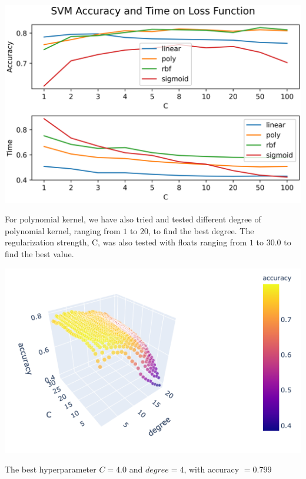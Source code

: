 \documentclass[11.5pt]{article}
\begin{document}
\begin{enumerate}
\begin{itemize}
\begin{enumerate}
                \includegraphics[width=0.75\linewidth]{images/svm_kernel.png}

                For polynomial kernel, we have also tried and tested different degree of polynomial kernel, ranging from $1$ to $20$, to find the best degree.
                The regularization strength, C, was also tested with floats ranging from $1$ to $30.0$ to find the best value.

                \includegraphics[width=0.75\linewidth]{images/svm_c_degree.png}

                The best hyperparameter $C = 4.0$ and $degree = 4$, with accuracy $= 0.799$

                \begin{figure}


\end{figure}
\end{enumerate}
\end{itemize}
\end{enumerate}
\end{document}
